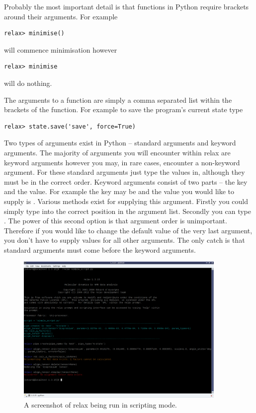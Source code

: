 Probably the most important detail is that functions in Python require brackets around their arguments.  For example

\begin{lstlisting}[numbers=none]
relax> minimise()
\end{lstlisting}

will commence minimisation however

\begin{lstlisting}[numbers=none]
relax> minimise
\end{lstlisting}

will do nothing.

The arguments to a function are simply a comma separated list within the brackets of the function.  For example to save the program's current state type

\begin{lstlisting}[numbers=none]
relax> state.save('save', force=True)
\end{lstlisting}

Two types of arguments exist in Python -- standard arguments and keyword arguments.  The majority of arguments you will encounter within relax are keyword arguments however you may, in rare cases, encounter a non-keyword argument.  For these standard arguments just type the values in, although they must be in the correct order.  Keyword arguments consist of two parts -- the key and the value.  For example the key may be  and the value you would like to supply is .  Various methods exist for supplying this argument.  Firstly you could simply type  into the correct position in the argument list.  Secondly you can type .  The power of this second option is that argument order is unimportant.  Therefore if you would like to change the default value of the very last argument, you don't have to supply values for all other arguments.  The only catch is that standard arguments must come before the keyword arguments.


\begin{figure}
\centerline{\includegraphics[width=0.9\textwidth, bb=14 14 1065 768]{graphics/screenshots/relax_script_mode}}
\caption[Scripting screenshot]{A screenshot of relax being run in scripting mode.}\label{fig: relax script}
\end{figure}


